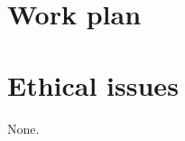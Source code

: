 \documentclass[11pt]{article}
\begin{document}
\section{Work plan}

\pagebreak
\section{Ethical issues}
None.






%






\pagebreak


\begin{spacing}{1}


\end{spacing}
\end{document}
